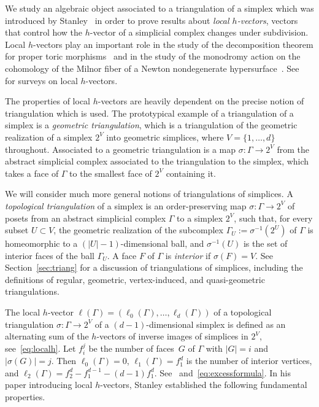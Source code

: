\documentclass[11pt]{article}
\theoremstyle{definition}
\numberwithin{equation}{section}
\numberwithin{equation}{section}
\begin{document}
We study an algebraic object associated to a triangulation of a simplex which was introduced by Stanley~\cite{Stanleylocalh} in order to prove results about \emph{local $h$-vectors}, vectors that control how the $h$-vector of a simplicial complex changes under subdivision. 
Local $h$-vectors play an important role in the study of the decomposition theorem for proper toric morphisms~\cite{deCataldoMiglioriniMustata18,KatzStapledon16} and in the study of the monodromy action on the cohomology of the Milnor fiber of a Newton nondegenerate hypersurface~\cite{Stapledon17,LPS2}.
See~\cite{ChanSurvey,AthanasiadisSurvey} for surveys  on local $h$-vectors. 

The properties of local $h$-vectors are heavily dependent on the precise notion of triangulation which is used. The prototypical example of a triangulation of a simplex is a \emph{geometric triangulation}, which is a triangulation of the geometric realization of a simplex $2^V$ into geometric simplices, where $V = \{ 1,\ldots, d\}$ throughout. 
Associated to a geometric triangulation is a map $\sigma \colon \Gamma \to 2^V$ from the abstract simplicial complex associated to the triangulation to the simplex, which takes a face of $\Gamma$ to the smallest face of $2^V$ containing it. 

We will consider much more general notions of triangulations of simplices. 
A \emph{topological triangulation} of a simplex is an order-preserving  map $\sigma \colon \Gamma \to 2^V$ of posets from an abstract simplicial complex $\Gamma$ to a simplex $2^V$, such that, for every subset $U \subset V$, 
the geometric realization of the subcomplex $\Gamma_U := \sigma^{-1}(2^U)$ of $\Gamma$ is homeomorphic to a $(|U| - 1)$-dimensional ball, and $\sigma^{-1}(U)$ is the set of interior faces of the ball $\Gamma_U$. 
A face $F$ of $\Gamma$ is \emph{interior} if $\sigma(F) = V$. 
See Section~\ref{sec:triang} for a discussion of triangulations of simplices, including the definitions of regular, geometric, vertex-induced, and quasi-geometric triangulations. 

The {local $h$-vector} $\ell(\Gamma) = (\ell_0(\Gamma), \dotsc, \ell_d(\Gamma))$ of a topological triangulation \mbox{$\sigma \colon \Gamma \to 2^V$} of a $(d-1)$-dimensional simplex is defined as an alternating sum of the $h$-vectors of inverse images of simplices in $2^V$, see~\eqref{eq:localh}. 
Let $f_i^j$ be the number of faces~$G$ of $\Gamma$ with $|G| = i$ and $|\sigma(G)| = j$. Then $\ell_0(\Gamma) = 0$, $\ell_1(\Gamma) = f_1^d$ is the number of interior vertices, and $\ell_2(\Gamma) = f_2^d - f_1^{d-1} - (d-1)f_1^{d}$. See~\cite[Example 2.3]{Stanleylocalh} and~\eqref{eq:excessformula}. In his paper introducing local $h$-vectors, Stanley established the following fundamental properties. 
\end{document}
